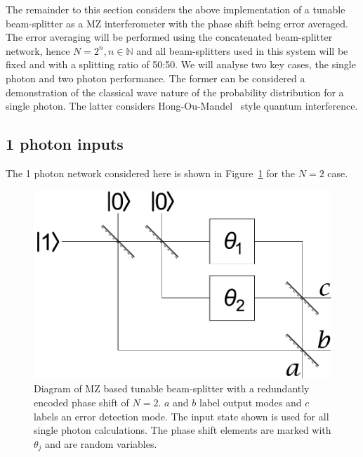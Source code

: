 \documentclass[aps,pra,twocolumn,superscriptaddress,numerical,floatfix]{revtex4-1}
\begin{document}

The remainder to this section considers the above implementation of a tunable beam-splitter as a MZ interferometer with the phase shift being error averaged. The error averaging will be performed using the concatenated beam-splitter network, hence $N=2^n, n \in \mathbb{N}$ and all beam-splitters used in this system will be fixed and with a splitting ratio of 50:50. We will analyse two key cases, the single photon and two photon performance.  The former can be considered a demonstration of the classical wave nature of the probability distribution for a single photon.  The latter considers Hong-Ou-Mandel~\cite{hom} style quantum interference.

\subsection{1 photon inputs \label{1 photon N arbitrary}}

The 1 photon network considered here is shown in Figure~\ref{fig:MZ_setup} for the $N=2$ case.  
\begin{figure}[tbh]
	\includegraphics[width=\columnwidth]{beam_splitter_system.pdf}
	\caption{\label{fig:MZ_setup}Diagram of MZ based tunable beam-splitter with a redundantly encoded phase shift of $N=2$. $a$ and $b$ label output modes and $c$ labels an error detection mode. The input state shown is used for all single photon calculations. The phase shift elements are marked with $\theta_{j}$ and are random variables.}
\end{figure}
	
\end{document}
